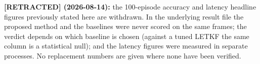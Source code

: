 \documentclass[11pt]{report}
\numberwithin{equation}{chapter}
\numberwithin{figure}{chapter}
\numberwithin{table}{chapter}
\newcommand{\WS}{\textsc{WaveSplat}}
\begin{document}
\textbf{[RETRACTED] (2026-08-14):} the 100-episode accuracy and latency headline
figures previously stated here are withdrawn. In the underlying result file the
proposed method and the baselines were never scored on the same frames; the verdict
depends on which baseline is chosen (against a tuned LETKF the same column is a
statistical null); and the latency figures were measured in separate processes.
No replacement numbers are given where none have been verified.
\end{document}
